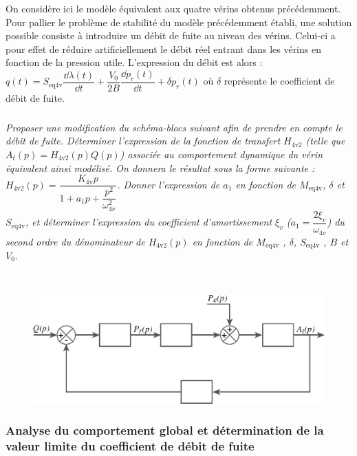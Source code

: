 \documentclass[10pt,fleqn]{article} %
\begin{document}
On considère ici le modèle équivalent aux quatre vérins obtenus précédemment. Pour pallier le problème de
stabilité du modèle précédemment établi, une solution possible consiste à introduire un débit de fuite au niveau
des vérins. Celui-ci a pour effet de réduire artificiellement le débit réel entrant dans les vérins en fonction de la
pression utile. L’expression du débit est alors :
$q(t)=S_{\text{eq4v}}\dfrac{\dd \lambda(t)}{\dd t}+\dfrac{V_0}{2B}\dfrac{\dd p_{r}(t)}{\dd t} +\delta p_{r}(t)$ où $\delta$ représente le coefficient de débit de fuite.


\subparagraph{\label{q_34}}\textit{Proposer une modification du schéma-blocs suivant
afin de prendre en compte le débit de fuite.
Déterminer l’expression de la fonction de transfert $H_{\text{4v2}}$ (telle que $A_t(p) = H_{\text{4v2}}(p) Q(p)$)
associée au comportement dynamique du vérin équivalent ainsi modélisé. On donnera le
résultat sous la forme suivante : $H_{\text{4v2}}(p)=\dfrac{K_{\text{4v}}p}{1+a_1 p + \dfrac{p^2}{\omega_{4v}^2}}$.
Donner l’expression de $a_1$ en fonction de $M_{\text{eq4v}}$, $\delta$ et $S_{\text{eq4v}}$, et déterminer l’expression du coefficient d’amortissement $\xi_v$ ($a_1 =\dfrac{2\xi_v}{\omega_{4v}}$) du second ordre du dénominateur de $H_{\text{4v2}}(p)$ en
fonction de $M_{\text{eq4v}}$ , $\delta$, $S_{\text{eq4v}}$ , $B$ et $V_0$.
}
\ifprof
\begin{corrige} ~\\

\end{corrige}
\else

\begin{figure}[H]
\centering
\includegraphics[width=0.7\linewidth]{q_34}
\end{figure}

\fi

\subsubsection{Analyse du comportement global et détermination de la valeur limite du coefficient
de débit de fuite}
\end{document}
